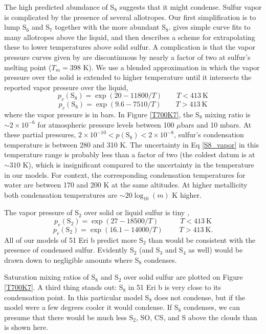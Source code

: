 \documentclass[preprint]{aastex6}
\begin{document}
The high predicted abundance of S$_8$ suggests that it might condense.
Sulfur vapor is complicated by the presence of several allotropes. %
Our first simplification is to lump S$_6$ and S$_7$ together with the more abundant S$_8$. 
\citet{Lyons2008} gives simple curve fits to many allotropes above the liquid, and then describes a scheme for 
extrapolating these to lower temperatures above solid sulfur.
A complication is that the vapor pressure curves given by \citet{Lyons2008} are discontinuous by
 nearly a factor of two at sulfur's melting point ($T_m=398$ K).
We use a blended approximation in which the vapor pressure over the solid is extended
to higher temperature until it intersects the reported vapor pressure over the liquid,
 \[
 p_v(\mathrm{S}_8) = \exp{\left(20 -11800/T\right)} \qquad  T < 413 \mathrm{~K}
 \]
\begin{equation}
\label{S8_vapor}
 p_v(\mathrm{S}_8) = \exp{\left(9.6 -7510/T\right)} \qquad T > 413 \mathrm{~K}
\end{equation}
where the vapor pressure is in bars.  
In Figure \ref{T700K7}, the S$_8$ mixing ratio is $\sim 2\times 10^{-6}$ for atmospheric pressure levels between 100 $\mu$bars and 10 mbars.
At these partial pressures, $2\times 10^{-10} < p(\mathrm{S}_8) < 2\times 10^{-8}$, sulfur's condensation temperature is between 280 and 310 K.
The uncertainty in Eq \ref{S8_vapor} in this temperature range is probably less than a factor of two (the coldest datum is at $\sim 310$ K),
which is insignificant compared to the uncertainty in the temperature in our models.
For context, the corresponding condensation temperatures for water are between 170 and 200 K at the same altitudes.
At higher metallicity both condensation temperatures are $\sim 20\log_{10}(m)$ K higher. 

The vapor pressure of S$_2$ over solid or liquid sulfur is tiny \citep{Lyons2008}, 
\[
 p_v(\mathrm{S}_2) = \exp{\left(27 -18500/T\right)} \quad\qquad  T < 413 \mathrm{~K}
\]
\begin{equation}
\label{S2_vapor}
 p_v(\mathrm{S}_2) = \exp{\left(16.1 -14000/T\right)} \;\qquad T > 413 \mathrm{~K} .
\end{equation}
All of our models of 51 Eri b predict more S$_2$ than would be consistent
with the presence of condensed sulfur.  Evidently
S$_2$ (and S$_3$ and S$_4$ as well) would be drawn down to negligible amounts where S$_8$ condenses.

Saturation mixing ratios of S$_8$ and S$_2$ over solid sulfur are plotted on Figure \ref{T700K7}. 
A third thing stands out: S$_8$ in 51 Eri b is very close to its condensation point.
In this particular model S$_8$ does not condense, but if the model were a few degrees cooler
it would condense.
If S$_8$ condenses, we can presume that there would be much less S$_2$, SO, CS, and S above the clouds
than is shown here.   
\end{document}
